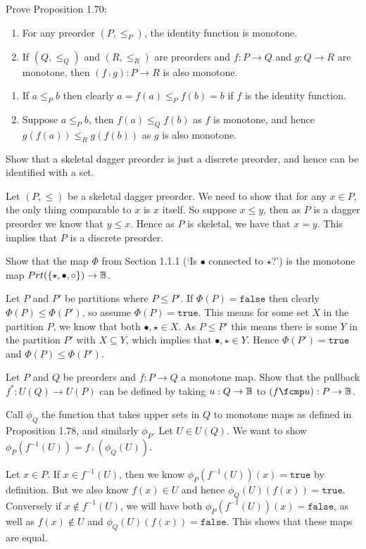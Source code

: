 \solution

Prove Proposition 1.70:
\begin{enumerate}
    \item For any preorder $(P, \leq_P)$, the identity function is monotone.
    \item If $(Q, \leq_Q)$ and $(R, \leq_R)$ are preorders and $f:P\to Q$ and $g:Q\to R$ are monotone, then $(f\fcmp g):P\to R$ is also monotone.
\end{enumerate}

\solution
\begin{enumerate}
	\item If $a \leq_P b$ then clearly $a = f(a)\leq_P f(b) = b$ if $f$ is the identity function.
	\item Suppose $a\leq_P b$, then $f(a) \leq_Q f(b)$ as $f$ is monotone, and hence $g(f(a)) \leq_R g(f(b))$ as $g$ is also monotone.
\end{enumerate}

Show that a skeletal dagger preorder is just a discrete preorder, and hence can be identified with a set.

\solution
Let $(P, \leq)$ be a skeletal dagger preorder.  We need to show that for any $x\in P$, the only thing comparable to $x$ is $x$ itself.  So suppose $x\leq y$, then as $P$ is a dagger preorder we know that $y\leq x$.  Hence as $P$ is skeletal, we have that $x=y$.  This implies that $P$ is a discrete preorder.

Show that the map $\Phi$ from Section 1.1.1 (`Is $\bullet$ connected to $\star$?') is the monotone map $Prt(\{\star, \bullet, \circ\})\to\mathbb{B}$.

\solution
Let $P$ and $P'$ be partitions where $P\leq P'$.  If $\Phi(P)=\texttt{false}$ then clearly $\Phi(P)\leq\Phi(P')$, so assume $\Phi(P) = \texttt{true}$.  This means for some set $X$ in the partition $P$, we know that both $\bullet, \star\in X$.  As $P\leq P'$ this means there is some $Y$ in the partition $P'$  with $X\subseteq Y$, which implies that $\bullet,\star\in Y$.  Hence $\Phi(P')=\texttt{true}$ and $\Phi(P)\leq\Phi(P')$.

Let $P$ and $Q$ be preorders and $f:P\to Q$ a monotone map.  Show that the pullback $f^*:U(Q)\to U(P)$ can be defined by taking $u:Q\to\mathbb{B}$ to $(f\fcmp u):P\to\B$.

\solution
Call $\phi_Q$ the function that takes upper sets in $Q$ to monotone maps as defined in Proposition 1.78, and similarly $\phi_P$.  Let $U\in U(Q)$.  We want to show $\phi_P(f^{-1}(U)) = f\fcmp (\phi_Q(U))$.

Let $x\in P$.  If $x\in f^{-1}(U)$, then we know $\phi_P(f^{-1}(U))(x)=\texttt{true}$ by definition.  But we also know $f(x)\in U$ and hence $\phi_Q(U)(f(x)) = \texttt{true}$.  Conversely if $x\not\in f^{-1}(U)$, we will have both $\phi_P(f^{-1}(U))(x)=\texttt{false}$, as well as $f(x)\not\in U$ and $\phi_Q(U)(f(x)) = \texttt{false}$.  This shows that these maps are equal.

